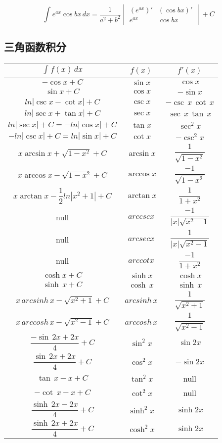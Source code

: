 \begin{displaymath}
\int_{}^{} e^{ax}\cos bx \,dx 
= \frac{1}{a^2 + b^2}
\begin{vmatrix}
  (e^{ax})' & (\cos bx)' \\ 
  e^{ax} & \cos bx
\end{vmatrix}
+ C
\end{displaymath}


\subsection{三角函数积分}
\begin{center}
\begin{tabular}{ c c c }
\hline
\(\displaystyle \int_{}^{} f(x) \,dx\) & \(f(x)\) & \(f'(x)\) \\
\hline
\(-\cos x + C\) & \(\sin x\) & \(\cos x\) \\
\(\sin x + C\) & \(\cos x\) & \(-\sin x\) \\
\(ln|\csc x - \cot x| + C\) & \(\csc x\) & \(-\csc\,x\,\cot\,x\) \\
\(ln|\sec x + \tan x| + C\) & \(\sec x\) & \(\sec\,x\,\tan\,x\) \\
\(ln|\sec x| + C = -ln|\cos x| + C\) & \(\tan x\) & \(\sec^{2}x\) \\
\(-ln|\csc x| + C = ln|\sin x| + C\) & \(\cot x\) & \(-\csc^{2}x\) \\
\(x\arcsin x + \sqrt{1 - x^{2}} + C\) & \(\arcsin x\) & \(\dfrac{1}{\sqrt{1 - x^{2}}}\) \\
\(x\arccos x - \sqrt{1 - x^{2}} + C\) & \(\arccos x\) & \(\dfrac{-1}{\sqrt{1 - x^{2}}}\) \\
\(x\arctan x - \dfrac{1}{2}ln|x^{2} + 1| + C\) & \(\arctan x\) & \(\dfrac{1}{1 + x^{2}}\) \\
null & \(arccsc x\) & \(\dfrac{-1}{|x|\sqrt{x^{2} - 1}}\) \\
null & \(arcsec x\) & \(\dfrac{1}{|x|\sqrt{x^{2} - 1}}\) \\
null & \(arccot x\) & \(\dfrac{-1}{1 + x^{2}}\) \\
\(\cosh x + C\) & \(\sinh x\) & \(\cosh x\) \\
\(\sinh\,x + C\) & \(\cosh\,x\) & \(\sinh\,x\) \\
\(x\,arcsinh\,x - \sqrt{x^{2} + 1} + C\) & \(arcsinh\,x\) & \(\dfrac{1}{\sqrt{x^{2} + 1}}\) \\
\(x\,arccosh\,x - \sqrt{x^{2} - 1} + C\) & \(arccosh\,x\) & \(\dfrac{1}{\sqrt{x^{2} - 1}}\) \\
\(\dfrac{-\sin\,2x + 2x}{4} + C\) & \(\sin^{2}x\) & \(\sin2x\) \\
\(\dfrac{\sin\,2x + 2x}{4} + C\) & \(\cos^{2}x\) & \(-\sin2x\) \\
\(\tan\,x - x + C\) & \(\tan^{2}x\) & null \\
\(-\cot\,x - x + C\) & \(\cot^{2}x\) & null \\
\(\dfrac{\sinh\,2x - 2x}{4} + C\) & \(\sinh^{2}x\) & \(\sinh2x\) \\
\(\dfrac{\sinh\,2x + 2x}{4} + C\) & \(\cosh^{2}x\) & \(\sinh2x\) \\
\hline
\end{tabular}
\end{center}

